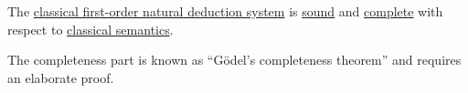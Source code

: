 \begin{theorem}\label{thm:classical_first_order_logic_is_sound_and_complete}
  The \hyperref[def:first_order_natural_deduction_system]{classical first-order natural deduction system} is \hyperref[def:derivability_and_satisfiability/soundness]{sound} and \hyperref[def:derivability_and_satisfiability/completeness]{complete} with respect to \hyperref[def:first_order_semantics]{classical semantics}.

  The completeness part is known as \enquote{G\"odel's completeness theorem} and requires an elaborate proof.
\end{theorem}

